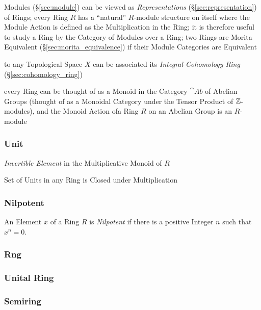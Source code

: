 \begin{itemize}
\fist Modules (\S\ref{sec:module}) can be viewed as \emph{Representations}
(\S\ref{sec:representation}) of Rings; every Ring $R$ has a ``natural''
$R$-module structure on itself where the Module Action is defined as the
Multiplication in the Ring; it is therefore useful to study a Ring by the
Category of Modules over a Ring; two Rings are Morita Equivalent
(\S\ref{sec:morita_equivalence}) if their Module Categories are Equivalent

to any Topological Space $X$ can be associated its \emph{Integral Cohomology
  Ring} (\S\ref{sec:cohomology_ring})

every Ring can be thought of as a Monoid in the Category $\cat{Ab}$ of Abelian
Groups (thought of as a Monoidal Category under the Tensor Product of
$\mathbb{Z}$-modules), and the Monoid Action ofa Ring $R$ on an Abelian Group is an
$R$-module



\subsubsection{Unit}\label{sec:ring_unit}

\emph{Invertible Element} in the Multiplicative Monoid of $R$

Set of Units in any Ring is Closed under Multiplication



\subsubsection{Nilpotent}\label{sec:nilpotent}

An Element $x$ of a Ring $R$ is \emph{Nilpotent} if there is a
positive Integer $n$ such that $x^n = 0$.



\subsubsection{Rng}\label{sec:rng}

\subsubsection{Unital Ring}\label{sec:unital_ring}

\subsubsection{Semiring}\label{sec:semiring}


\end{itemize}
